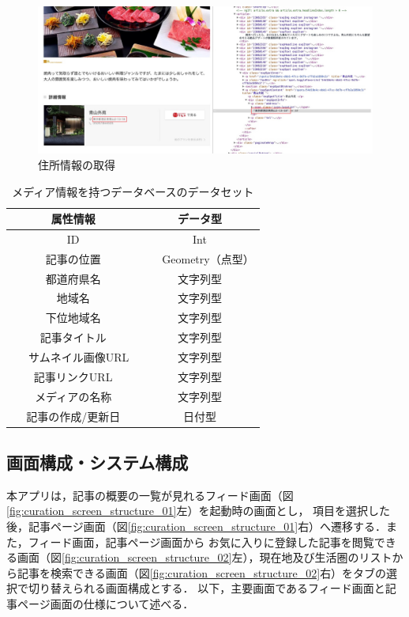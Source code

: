 \documentclass[a4paper]{jsarticle}
\begin{document}
\begin{enumerate}
\begin{enumerate}
\fifigure
\begin{figure}[H]
  \begin{center}
    \includegraphics[width=0.95\hsize]{./images/curation_scraping_article.jpg}
    \caption{住所情報の取得}
    \label{fig:curation-scraping-article}
  \end{center}
\end{figure}
\fi

\begin{table}[H]
  \begin{center}
    \caption{メディア情報を持つデータベースのデータセット}
    \renewcommand\arraystretch{1.4}
    \begin{tabular}{|c|c|}
      \hline
      属性情報 & データ型 \\
      \hline
      \hline
      ID & Int \\
      \hline
      記事の位置 & 　Geometry（点型）　 \\
      \hline
      都道府県名 & 文字列型 \\
      \hline
      地域名 & 文字列型 \\
      \hline
      下位地域名 & 文字列型 \\
      \hline
      記事タイトル & 文字列型 \\
      \hline
      　サムネイル画像URL　 & 文字列型 \\
      \hline
      記事リンクURL & 文字列型 \\
      \hline
      メディアの名称 & 文字列型 \\
      \hline
      記事の作成/更新日 & 日付型 \\
      \hline
    \end{tabular}
    \label{tab:curation-database}
  \end{center}
\end{table}


\subsection{画面構成・システム構成}
本アプリは，記事の概要の一覧が見れるフィード画面（図\ref{fig:curation_screen_structure_01}左）を起動時の画面とし，
項目を選択した後，記事ページ画面（図\ref{fig:curation_screen_structure_01}右）へ遷移する．また，フィード画面，記事ページ画面から
お気に入りに登録した記事を閲覧できる画面（図\ref{fig:curation_screen_structure_02}左），現在地及び生活圏のリストから記事を検索できる画面（図\ref{fig:curation_screen_structure_02}右）をタブの選択で切り替えられる画面構成とする．
以下，主要画面であるフィード画面と記事ページ画面の仕様について述べる．


\end{enumerate}
\end{enumerate}
\end{document}

